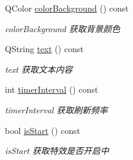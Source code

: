 \begin{DoxyCompactItemize}
Q\+Color \mbox{\hyperlink{class_q_qt_led_banner_label_a15864eb5288ce5a04d481e81db8c9ccd}{color\+Background}} () const
\begin{DoxyCompactList}\small\item\em color\+Background 获取背景颜色 \end{DoxyCompactList}\item 
Q\+String \mbox{\hyperlink{class_q_qt_led_banner_label_a43d0a3391b1a4699d4a4d448e5686157}{text}} () const
\begin{DoxyCompactList}\small\item\em text 获取文本内容 \end{DoxyCompactList}\item 
int \mbox{\hyperlink{class_q_qt_led_banner_label_a42395262bc37d0b2d18edae7599dd9c1}{timer\+Interval}} () const
\begin{DoxyCompactList}\small\item\em timer\+Interval 获取刷新频率 \end{DoxyCompactList}\item 
bool \mbox{\hyperlink{class_q_qt_led_banner_label_a0916aa1382ca0d343546c4af4afa0b89}{is\+Start}} () const
\begin{DoxyCompactList}\small\item\em is\+Start 获取特效是否开启中 \end{DoxyCompactList}\end{DoxyCompactItemize}
